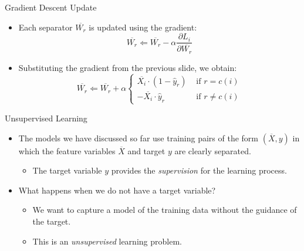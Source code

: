 \begin{frame}{Gradient Descent Update}
\begin{itemize}
\item Each separator $\overline{W_r}$ is updated using the gradient:
\begin{equation*}
\overline{W_r} \Leftarrow \overline{W_r} - \alpha \frac{\partial
L_i}{\partial \overline{W_r}}
\end{equation*}
\item Substituting the gradient from the previous slide, we obtain:
\begin{equation*}
\overline{W_r} \Leftarrow \overline{W_r}  + \alpha
\begin{cases}
\overline{X_i} \cdot (1 - \hat{y}_r) & \mbox{ if $r= c(i)$}\\
-\overline{X_i} \cdot \hat{y}_r & \mbox{ if $r \not=c(i)$}
\end{cases}
\end{equation*}
\end{itemize}
\end{frame}




\begin{frame}{Unsupervised Learning}
\begin{itemize}
\item The models we have discussed so far use training pairs of the
form $(\overline{X}, y)$ in which the feature variables
$\overline{X}$ and target $y$ are clearly separated.
\begin{itemize}
\item The target variable $y$ provides the {\em supervision} for the
learning process.
\end{itemize}
\item What happens when we do not have a target variable?
\begin{itemize}
\item We want to capture a model of the
training data without the guidance of the target. \item This is an
{\em unsupervised} learning problem.
\end{itemize}
\end{itemize}
\end{frame}



